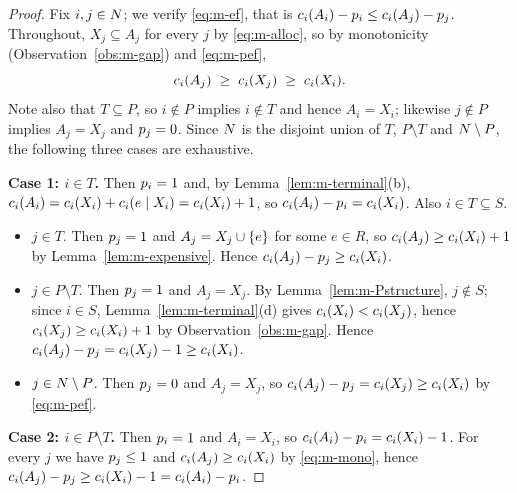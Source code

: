 \begin{proof}
Fix $i,j \in N$; we verify \eqref{eq:m-ef}, that is
$c_i(A_i) - p_i \le c_i(A_j) - p_j$. Throughout,
$X_j \subseteq A_j$ for every $j$ by \eqref{eq:m-alloc}, so by monotonicity
(Observation~\ref{obs:m-gap}) and \eqref{eq:m-pef},
\begin{equation}
\label{eq:m-mono}
  c_i(A_j) \;\ge\; c_i(X_j) \;\ge\; c_i(X_i) .
\end{equation}
Note also that $T \subseteq P$, so $i \notin P$ implies $i \notin T$ and hence
$A_i = X_i$; likewise $j \notin P$ implies $A_j = X_j$ and $p_j = 0$.
Since $N$ is the disjoint union of $T$, $P \setminus T$ and
$N \setminus P$, the following three cases are exhaustive.

\smallskip
\noindent\textbf{Case 1: $i \in T$.} Then $p_i = 1$ and, by
Lemma~\ref{lem:m-terminal}(b), $c_i(A_i) = c_i(X_i) + c_i(e \mid X_i)
= c_i(X_i) + 1$, so $c_i(A_i) - p_i = c_i(X_i)$. Also
$i \in T \subseteq S$.
\begin{itemize}
  \item[(1a)] $j \in T$. Then $p_j = 1$ and $A_j = X_j \cup \left\{e\right\}$ for
    some $e \in R$, so $c_i(A_j) \ge c_i(X_i) + 1$ by
    Lemma~\ref{lem:m-expensive}. Hence
    $c_i(A_j) - p_j \ge c_i(X_i)$.
  \item[(1b)] $j \in P \setminus T$. Then $p_j = 1$ and $A_j = X_j$. By
    Lemma~\ref{lem:m-Pstructure}, $j \notin S$; since $i \in S$,
    Lemma~\ref{lem:m-terminal}(d) gives $c_i(X_i) < c_i(X_j)$, hence
    $c_i(X_j) \ge c_i(X_i) + 1$ by Observation~\ref{obs:m-gap}. Hence
    $c_i(A_j) - p_j = c_i(X_j) - 1 \ge c_i(X_i)$.
  \item[(1c)] $j \in N \setminus P$. Then $p_j = 0$ and
    $A_j = X_j$, so $c_i(A_j) - p_j = c_i(X_j) \ge c_i(X_i)$
    by \eqref{eq:m-pef}.
\end{itemize}

\smallskip
\noindent\textbf{Case 2: $i \in P \setminus T$.} Then $p_i = 1$ and
$A_i = X_i$, so $c_i(A_i) - p_i = c_i(X_i) - 1$. For every $j$
we have $p_j \le 1$ and $c_i(A_j) \ge c_i(X_i)$ by
\eqref{eq:m-mono}, hence
$c_i(A_j) - p_j \ge c_i(X_i) - 1 = c_i(A_i) - p_i$.


\end{proof}
